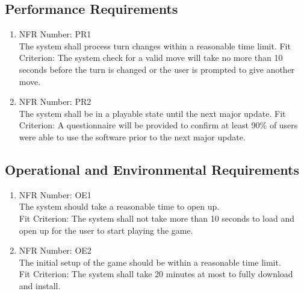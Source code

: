 \documentclass[12pt, titlepage]{article}
\begin{document}
\subsection{Performance Requirements}
\begin{enumerate}
    \item NFR Number: PR1\\%
    The system shall process turn changes within a reasonable time limit.
    Fit Criterion: The system check for a valid move will take no more than 10 seconds before the turn is changed or the user is prompted to give another move.
    \item NFR Number: PR2\\%
    The system shall be in a playable state until the next major update.
    Fit Criterion: A questionnaire will be provided to confirm at least 90\% of users were able to use the software prior to the next major update.
\end{enumerate}

\subsection{Operational and Environmental Requirements}
\begin{enumerate} %
    \item NFR Number: OE1\\
    The system should take a reasonable time to open up.\\
    Fit Criterion: The system shall not take more than 10 seconds to load and open up for the user to start playing the game.
    \item NFR Number: OE2\\
    The initial setup of the game should be within a reasonable time limit.\\
    Fit Criterion: The system shall take 20 minutes at most to fully download and install.
\end{enumerate}
\end{document}
